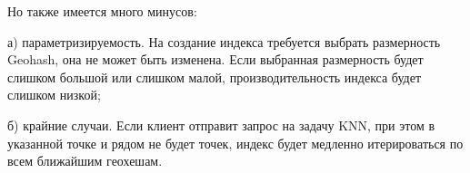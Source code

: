 Но также имеется много минусов:
\par а) параметризируемость. На создание индекса требуется выбрать размерность Geohash, она не может быть изменена. Если выбранная размерность будет слишком большой или слишком малой, производительность индекса будет слишком низкой;
\par б) крайние случаи. Если клиент отправит запрос на задачу KNN, при этом в указанной точке и рядом не будет точек, индекс будет медленно итерироваться по всем ближайшим геохешам.